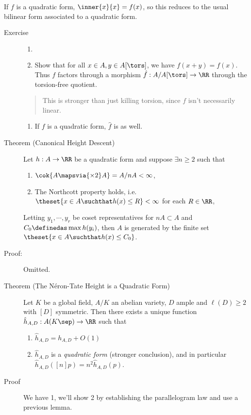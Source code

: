 If \(f\) is a quadratic form, \(\inner{x}{x} = f(x)\), so this reduces
to the usual bilinear form associated to a quadratic form.

\begin{description}
\item[Exercise]
\begin{enumerate}
\def\labelenumi{\alph{enumi}.}
\tightlist
\item[]
\item
  Show that for all \(x\in A, y\in A[\tors]\), we have
  \(f(x+y) = f(x)\). Thus \(f\) factors through a morphism
  \(\hat f: A/A[\tors] \to \RR\) through the torsion-free quotient.
\end{enumerate}

\begin{quote}
This is stronger than just killing torsion, since \(f\) isn't
necessarily linear.
\end{quote}

\begin{enumerate}
\def\labelenumi{\alph{enumi}.}
\setcounter{enumi}{1}
\tightlist
\item
  If \(f\) is a quadratic form, \(\hat f\) is as well.
\end{enumerate}
\item[Theorem (Canonical Height Descent)]
Let \(h: A\to \RR\) be a quadratic form and suppose \(\exists n\geq 2\)
such that

\begin{enumerate}
\def\labelenumi{\arabic{enumi}.}
\item
  \(\cok{A \mapsvia{\times 2} A} = A/nA < \infty\),
\item
  The Northcott property holds,
  i.e.~\(\theset{x\in A \suchthat h(x) \leq R} < \infty\) for each
  \(R\in \RR\),
\end{enumerate}

Letting \(y_1, \cdots, y_r\) be coset representatives for
\(nA \subset A\) and \(C_0 \definedas \max h(y_i)\), then \(A\) is
generated by the finite set \(\theset{x\in A \suchthat h(x) \leq C_0}\).
\item[Proof:]
Omitted.
\item[Theorem (The Néron-Tate Height is a Quadratic Form)]
Let \(K\) be a global field, \(A/K\) an abelian variety, \(D\) ample and
\(\ell(D) \geq 2\) with \([D]\) symmetric. Then there exists a unique
function \(\hat h_{A, D}: A(K\sep) \to \RR\) such that

\begin{enumerate}
\def\labelenumi{\arabic{enumi}.}
\item
  \(\hat h_{A, D} = h_{A, D} + O(1)\)
\item
  \(\hat h_{A, D}\) is a \emph{quadratic form} (stronger conclusion),
  and in particular \(\hat h_{A, D}([n]p) = n^2 \hat h_{A, D}(p)\).
\end{enumerate}
\item[Proof]
We have 1, we'll show 2 by establishing the parallelogram law and use a
previous lemma.


\end{description}
